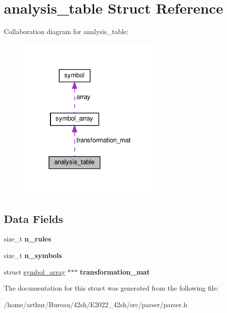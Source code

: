 \hypertarget{structanalysis__table}{}\section{analysis\+\_\+table Struct Reference}
\label{structanalysis__table}


Collaboration diagram for analysis\+\_\+table\+:
\nopagebreak
\begin{figure}[H]
\begin{center}
\leavevmode
\includegraphics[width=208pt]{structanalysis__table__coll__graph}
\end{center}
\end{figure}
\subsection*{Data Fields}
\begin{DoxyCompactItemize}
\item 
\mbox{\label{structanalysis__table_aebc2d8452bd9e44d0ad2b9ad8ac30ed3}} 
size\+\_\+t {\bfseries n\+\_\+rules}
\item 
\mbox{\label{structanalysis__table_a79bd7d140a7a70026886a32749aba8e6}} 
size\+\_\+t {\bfseries n\+\_\+symbols}
\item 
\mbox{\label{structanalysis__table_a7a0ee89b2e2fa7bc58913f94ad24d23e}} 
struct \hyperlink{structsymbol__array}{symbol\+\_\+array} $\ast$$\ast$$\ast$ {\bfseries transformation\+\_\+mat}
\end{DoxyCompactItemize}


The documentation for this struct was generated from the following file\+:\begin{DoxyCompactItemize}
\item 
/home/arthur/\+Bureau/42sh/\+E2022\+\_\+42sh/src/parser/parser.\+h\end{DoxyCompactItemize}
